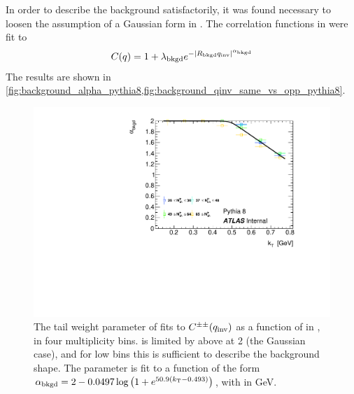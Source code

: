 In order to describe the background satisfactorily, it was found necessary to loosen the assumption of a Gaussian form in \qinv.
The \qinv correlation functions in  were fit to
\begin{equation} C(q) = 1 + \lambda_{\mathrm{bkgd}} e^{-|R_{\mathrm{bkgd}} q_{\mathrm{inv}}|^{\alpha_{\mathrm{bkgd}}}} \end{equation}
The results are shown in \cref{fig:background_alpha_pythia8,fig:background_qinv_same_vs_opp_pythia8}.

\begin{figure}[t]
\begin{minipage}[t]{1.0\textwidth}
\centering
\includegraphics{qinv_backAlpha_vs_kt_pythia8.pdf}
\end{minipage}
\caption{The tail weight parameter \abkgd of fits to $C^{\pm\pm}(q_{\mathrm{inv}})$ as a function of \kt in , in four multiplicity bins. \abkgd is limited by above at 2 (the Gaussian case), and for low \kt bins this is sufficient to describe the background shape. The parameter is fit to a function of the form $\alpha_{\mathrm{bkgd}} = 2 - 0.0497 \log \left(1 + e^{50.9(k_\mathrm{T} - 0.493)} \right)$, with \kt in GeV.
}
\label{fig:background_alpha_pythia8}
\end{figure}

